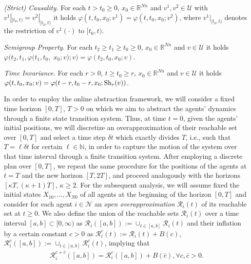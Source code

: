 \documentclass[reqno]{amsart}
\theoremstyle{plain}
\theoremstyle{definition}
\numberwithin{equation}{section}
\begin{document}
\noindent \textbullet\;\textit{(Strict) Causality.}\; For each $t> t_0\ge 0$, $x_0\in {\ensuremath{\mathbb{R}^{{Nn}}}}$ and $v^1,v^2\in\mathcal{U}$ with $v^1|_{[t_0,t)}=v^2|_{[t_0,t)}$ it holds $\varphi(t,t_0,x_0;v^1)=\varphi(t,t_0,x_0;v^2)$, where $v^1|_{[t_0,t)}$ denotes the restriction of $v^1(\cdot)$ to $[t_0,t)$.

\noindent \textbullet\;\textit{Semigroup Property.}\; For each $t_2\ge t_1\ge t_0\ge 0$, $x_0\in {\ensuremath{\mathbb{R}^{{Nn}}}}$ and $v\in\mathcal{U}$ it holds $
\varphi(t_2,t_1,\varphi(t_1,t_0,$ $x_0;v);v)=\varphi(t_2,t_0,x_0;v)$.

\noindent \textbullet\;\textit{Time Invariance.}\; For each $r>0$, $t\ge t_0\ge r$, $x_0\in {\ensuremath{\mathbb{R}^{{Nn}}}}$ and $v\in\mathcal{U}$ it holds $\varphi(t,t_0,x_0;v)=\varphi(t-r,t_0-r,x_0;{\rm Sh}_r(v))$.

In order to employ the online abstraction framework, we will consider a fixed time horizon $[0,T]$, $T>0$ on which we aim to abstract the agents' dynamics through a finite state transition system.  Thus, at time $t=0$, given the agents' initial positions, we will discretize an overapproximation of their reachable set over $[0,T]$ and select a time step $\delta t$ which exactly divides  $T$, i.e., such that $T=\ell\delta t$ for certain $\ell\in\mathbb{N}$, in order to capture the motion of the system over that time interval through a finite transition system. After employing a discrete plan over $[0,T]$, we repeat the same procedure for the positions of the agents at $t=T$ and the new horizon $[T,2T]$, and proceed analogously with the horizons $[\kappa T,(\kappa+1) T]$, $\kappa\ge 2$. For the subsequent analysis, we will assume fixed the initial states $X_{10},\ldots,X_{N0}$ of all agents at the beginning of the horizon $[0,T]$ and consider for each agent $i\in{\ensuremath{\mathcal{N}}}$ an \textit{open overapproximation} ${\ensuremath{\mathcal{R}}}_i(t)$ of its reachable set at $t\ge 0$. We also define the union of the reachable sets ${\ensuremath{\mathcal{R}}}_i(t)$ over a time interval $[a,b]\subset[0,\infty)$  as ${\ensuremath{\mathcal{R}}}_i([a,b]):=\cup_{t\in[a,b]}{\ensuremath{\mathcal{R}}}_i(t)$ and their inflation by a certain constant $c>0$ as ${\ensuremath{\mathcal{R}}}_i^c(t):={\ensuremath{\mathcal{R}}}_i(t)+B(c)$, ${\ensuremath{\mathcal{R}}}_i^c([a,b]):= \cup_{t\in[a,b]}{\ensuremath{\mathcal{R}}}_i^c(t)$, implying that
\begin{align} 
{\ensuremath{\mathcal{R}}}_i^{c+\bar{c}}([a,b]) ={\ensuremath{\mathcal{R}}}_i^c([a,b])+B(\bar{c}),\forall c,\bar{c}>0. \label{Rti:over:interval:inflaed:semigroup}
\end{align}
\end{document}
